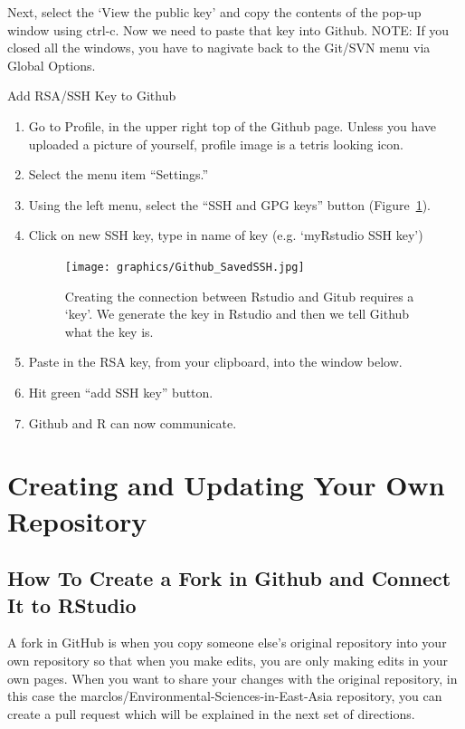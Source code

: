 \documentclass[12pt]{../SOP4_alpha}
\begin{document}
\NP Next, select the `View the public key' and copy the contents of the pop-up window using ctrl-c. Now we need to paste that key into Github. NOTE: If you closed all the windows, you have to nagivate back to the Git/SVN menu via Global Options. 

\NP Add RSA/SSH Key to Github
  \begin{enumerate}
  \item Go to Profile, in the upper right top of the Github page. Unless you have uploaded a picture of yourself, profile image is a tetris looking icon.
  \item Select the menu item ``Settings.''
  \item Using the left menu, select the ``SSH and GPG keys'' button (Figure~\ref{fig:githubkey}).
  \item Click on new SSH key, type in name of key (e.g. `myRstudio SSH key')
  
\begin{figure}
\centering
\texttt{[image: graphics/Github\_SavedSSH.jpg]}
\caption{Creating the connection between Rstudio and Gitub requires a `key'. We generate the key in Rstudio and then we tell Github what the key is.}
\label{fig:githubkey}
\end{figure}

  \item Paste in the RSA key, from your clipboard, into the window below.
  \item Hit green ``add SSH key'' button.
  \item Github and R can now communicate.
  \end{enumerate}

\section{Creating and Updating Your Own Repository}

\subsection {How To Create a Fork in Github and Connect It to RStudio}
A fork in GitHub is when you copy someone else's original repository into your own repository so that when you make edits, you are only making edits in your own pages. When you want to share your changes with the original repository, in this case the marclos/Environmental-Sciences-in-East-Asia repository, you can create a pull request which will be explained in the next set of directions. 
\end{document}
